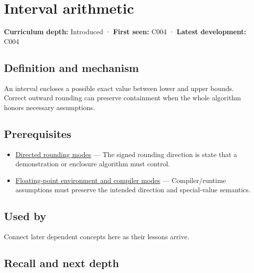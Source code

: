 \hypertarget{appendix-1823a14330cb}{}\label{referencestart:appendix-1823a14330cb}
\section{Interval arithmetic}\label{appendix-1823a14330cb-interval-arithmetic}

\textbf{Curriculum depth:} Introduced · \textbf{First seen:} C004 · \textbf{Latest development:} C004

\begin{allmightroledefinition}

\subsection{Definition and mechanism}\label{appendix-1823a14330cb-definition-and-mechanism}

An interval encloses a possible exact value between lower and upper bounds. Correct outward rounding can preserve containment when the whole algorithm honors necessary assumptions.

\end{allmightroledefinition}

\subsection{Prerequisites}\label{appendix-1823a14330cb-prerequisites}

\begin{itemize}
\tightlist
\item
  \hyperref[appendix-637d164ae5ca]{Directed rounding modes} --- The signed rounding direction is state that a demonstration or enclosure algorithm must control.
\item
  \hyperref[appendix-f11d1a521253]{Floating-point environment and compiler modes} --- Compiler/runtime assumptions must preserve the intended direction and special-value semantics.
\end{itemize}

\subsection{Used by}\label{appendix-1823a14330cb-used-by}

Connect later dependent concepts here as their lessons arrive.

\subsection{Recall and next depth}\label{appendix-1823a14330cb-recall-and-next-depth}

